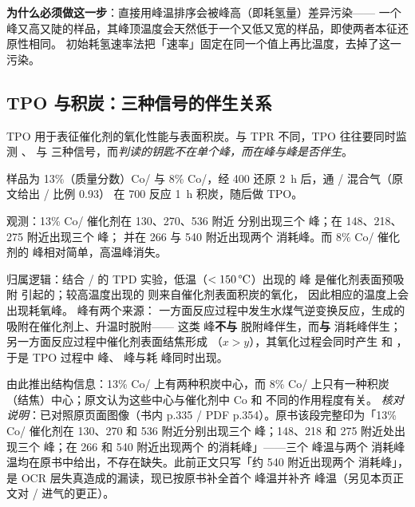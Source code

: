 \begin{dataflow}
\textbf{为什么必须做这一步}：直接用峰温排序会被峰高（即耗氢量）差异污染——
一个峰又高又陡的样品，其峰顶温度会天然低于一个又低又宽的样品，即使两者本征还原性相同。
初始耗氢速率法把「速率」固定在同一个值上再比温度，去掉了这一污染。
\end{dataflow}

\subsection{TPO 与积炭：三种信号的伴生关系}
\label{sec:ch05b-tpo}

\begin{probout}
TPO 用于表征催化剂的氧化性能与表面积炭。与 TPR 不同，TPO 往往要同时监测 、
与  三种信号，而\emph{判读的钥匙不在单个峰，而在峰与峰是否伴生}。
\end{probout}

\begin{dataflow}
样品为 13\%（质量分数）Co/ 与 8\% Co/，经 \qty{400}{\degC}  还原
\qty{2}{\hour} 后，通 / 混合气（原文给出 / 比例 0.93）
在 \qty{700}{\degC} 反应 \qty{1}{\hour} 积炭，随后做 TPO。

观测：13\% Co/ 催化剂在 \qty{130}{\degC}、\qty{270}{\degC}、\qty{536}{\degC} 附近
分别出现三个  峰；在 \qty{148}{\degC}、\qty{218}{\degC}、\qty{275}{\degC} 附近出现三个  峰；
并在 \qty{266}{\degC} 与 \qty{540}{\degC} 附近出现两个  消耗峰。而 8\% Co/ 催化剂的
 峰相对简单，高温峰消失。

归属逻辑：结合 / 的 TPD 实验，低温（$<\qty{150}{\degC}$）出现的  峰
是催化剂表面预吸附  引起的；较高温度出现的  则来自催化剂表面积炭的氧化，
因此相应的温度上会出现耗氧峰。 峰有两个来源：
一方面反应过程中发生水煤气逆变换反应，生成的  吸附在催化剂上、升温时脱附——
这类  峰\textbf{不与}  脱附峰伴生，而\textbf{与}  消耗峰伴生；
另一方面反应过程中催化剂表面结焦形成 （$x>y$），其氧化过程会同时产生  和 ，
于是 TPO 过程中  峰、 峰与耗  峰同时出现。

由此推出结构信息：13\% Co/ 上有两种积炭中心，而 8\% Co/ 上只有一种积炭
（结焦）中心；原文认为这些中心与催化剂中 Co 和  不同的作用程度有关。
\emph{核对说明}：已对照原页面图像（书内 p.335 / PDF p.354）。原书该段完整印为「13\% Co/ 催化剂在 \qty{130}{\degC}、\qty{270}{\degC} 和 \qty{536}{\degC} 附近分别出现三个  峰；\qty{148}{\degC}、\qty{218}{\degC} 和 \qty{275}{\degC} 附近处出现三个  峰；在 \qty{266}{\degC} 和 \qty{540}{\degC} 附近出现两个  的消耗峰」——三个  峰温与两个  消耗峰温均在原书中给出，不存在缺失。此前正文只写「约 \qty{540}{\degC} 附近出现两个  消耗峰」，是 OCR 层失真造成的漏读，现已按原书补全首个  峰温并补齐  峰温（另见本页正文对 / 进气的更正）。
\end{dataflow}

